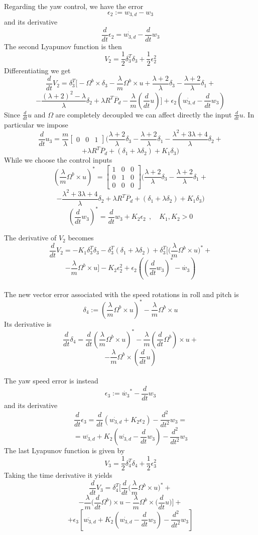 Regarding the yaw control, we have the error
\[\epsilon_2 := w_{3,d}-w_3\]
and its derivative
\[\frac{d}{dt}\epsilon_2=\dot{w_{3,d}}-\frac{d}{dt}w_3\]
The second Lyapunov function is then
\[V_2=\frac{1}{2}\delta_3^T\delta_3+\frac{1}{2}\epsilon_2^2\]
Differentiating we get
\[\frac{d}{dt}V_2=\delta_3^T\Bigg[-\Omega^b \times \delta_3-\frac{\lambda}{m}\Omega^b \times u+\frac{\lambda+2}{\lambda}\delta_3-\frac{\lambda+2}{\lambda}\delta_1+\]\[-\frac{(\lambda+2)^2-\lambda}{\lambda}\delta_2+\lambda R^T\dddot{P_d}-\frac{\lambda}{m}\left(\frac{d}{dt}u\right)\Bigg]+\epsilon_2\left(\dot{w_{3,d}}-\frac{d}{dt}w_3\right)\]
Since $\frac{d}{dt}u$ and $\Omega$ are completely decoupled we can affect directly the input $\frac{d}{dt}u$. In particular we impose
\[\frac{d}{dt}u_3=\frac{m}{\lambda}\begin{bmatrix}
0 & 0 &1 \end{bmatrix}\Bigg(\frac{\lambda+2}{\lambda}\delta_3-\frac{\lambda+2}{\lambda}\delta_1-\frac{\lambda^2+3\lambda+4}{\lambda}\delta_2+\]\[+\lambda R^T\dddot{P_d}+(\delta_1+\lambda\delta_2)+K_1\delta_3\Bigg)\]
While we choose the control inputs
\[\left(\frac{\lambda}{m}\Omega^b \times u\right)^*=
\begin{bmatrix}
    1 & 0 & 0 \\ 0 & 1 & 0 \\ 0 & 0 & 0
\end{bmatrix}\Bigg(\frac{\lambda+2}{\lambda}\delta_3-\frac{\lambda+2}{\lambda}\delta_1+\]\[-\frac{\lambda^2+3\lambda+4}{\lambda}\delta_2+\lambda R^T\dddot{P_d}+(\delta_1+\lambda\delta_2)+K_1\delta_3\Bigg)\]
\[\left(\frac{d}{dt}w_3\right)^*=\frac{d}{dt}w_3+K_2\epsilon_2 \:\:, \quad K_1,K_2>0\]

The derivative of $V_2$ becomes
\[\frac{d}{dt}V_2=-K_1\delta_3^T\delta_3-\delta_3^T(\delta_1+\lambda\delta_2)+\delta_3^T\Bigg[\Bigg(\frac{\lambda}{m}\Omega^b \times u\Bigg)^*+\]\[-\frac{\lambda}{m}\Omega^b \times u\Bigg]-K_2\epsilon_2^2+\epsilon_2\left(\left(\frac{d}{dt}w_3\right)^*-\dot{w_3}\right)\]
\\
The new vector error associated with
the speed rotations in roll and pitch is 
\[\delta_4:=\left(\frac{\lambda}{m}\Omega^b \times u\right)^*-\frac{\lambda}{m}\Omega^b \times u\]
Its derivative is
\[\frac{d}{dt}\delta_4=\frac{d}{dt}\left(\frac{\lambda}{m}\Omega^b \times u\right)^*-\frac{\lambda}{m}\left(\frac{d}{dt}\Omega^b\right)\times u+\]\[-\frac{\lambda}{m}\Omega^b \times \left(\frac{d}{dt}u\right)\]
\\
The yaw speed error is instead 
\[\epsilon_3:=\dot{w_3}^*-\frac{d}{dt}w_3\]
and its derivative
\[\frac{d}{dt}\epsilon_3=\frac{d}{dt}(\dot{w_{3,d}}+K_2\epsilon_2)-\frac{d^2}{dt^2}w_3=\]\[=\ddot{w_{3,d}}+K_2\left(\dot{w_{3,d}}-\frac{d}{dt}w_3\right)-\frac{d^2}{dt^2}w_3\]
The last Lyapunov function is given by
\[V_3=\frac{1}{2}\delta_4^T\delta_4+\frac{1}{2}\epsilon_3^2\]
Taking the time derivative it yields
\[\frac{d}{dt}V_3=\delta_4^T\Bigg[\frac{d}{dt}\Bigg(\frac{\lambda}{m}\Omega^b \times u\Bigg)^*+\]\[-\frac{\lambda}{m}\Bigg(\frac{d}{dt}\Omega^b\Bigg) \times u-\frac{\lambda}{m}\Omega^b \times \Bigg(\frac{d}{dt}u\Bigg) \Bigg]+\]\[+\epsilon_3\left[\ddot{w_{3,d}}+K_2\left(\dot{w_{3,d}}-\frac{d}{dt}w_3\right)-\frac{d^2}{dt^2}w_3\right]\]

